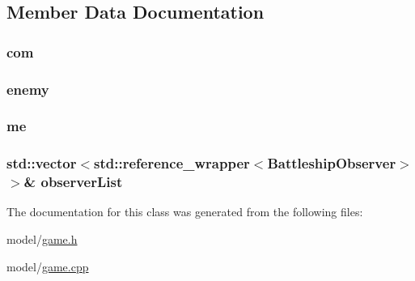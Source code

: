 \subsection{Member Data Documentation}
\subsubsection[{\texorpdfstring{com}{com}}]{ com\hspace{0.3cm}{\ttfamily [private]}}\hypertarget{classMODEL_1_1Game_ad4cdd6f3873de65537dda44338624c21}{}\label{classMODEL_1_1Game_ad4cdd6f3873de65537dda44338624c21}
\subsubsection[{\texorpdfstring{enemy}{enemy}}]{ enemy\hspace{0.3cm}{\ttfamily [protected]}}\hypertarget{classMODEL_1_1Game_a9d4d84ca610764d9de0ca5cca663dc17}{}\label{classMODEL_1_1Game_a9d4d84ca610764d9de0ca5cca663dc17}
\subsubsection[{\texorpdfstring{me}{me}}]{ me\hspace{0.3cm}{\ttfamily [protected]}}\hypertarget{classMODEL_1_1Game_ab8c6b1da146382b3d0d098e55cf4b54f}{}\label{classMODEL_1_1Game_ab8c6b1da146382b3d0d098e55cf4b54f}
\subsubsection[{\texorpdfstring{observer\+List}{observerList}}]{\setlength{\rightskip}{0pt plus 5cm}std\+::vector$<$std\+::reference\+\_\+wrapper$<${\bf Battleship\+Observer}$>$ $>$\& observer\+List\hspace{0.3cm}{\ttfamily [protected]}}\hypertarget{classMODEL_1_1Game_afada2cb52f9872db4f3ab6e72d07cd05}{}\label{classMODEL_1_1Game_afada2cb52f9872db4f3ab6e72d07cd05}


The documentation for this class was generated from the following files\+:\begin{DoxyCompactItemize}
\item 
model/\hyperlink{game_8h}{game.\+h}\item 
model/\hyperlink{game_8cpp}{game.\+cpp}\end{DoxyCompactItemize}
